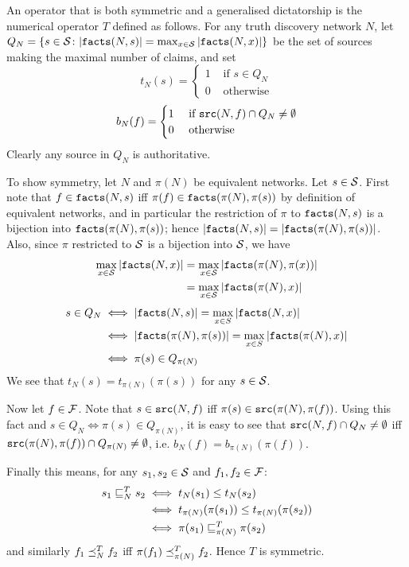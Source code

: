 \documentclass[../main.tex]{subfiles}
\begin{document}
\begin{example}
\label{example:symm_and_gen_dict}
An operator that is both symmetric and a generalised dictatorship is the
numerical operator $T$ defined as follows. For any truth discovery network $N$,
let $Q_N = \{s \in \S \colon |\fact(N, s)| = \max_{x \in \S}{|\fact(N, x)|}\}$
be the set of sources making the maximal number of claims, and set
\[
    t_N(s) = \begin{cases}
        1 & \text{ if } s \in Q_N \\
        0 & \text{ otherwise}
    \end{cases}
\]
\[
    b_N(f) = \begin{cases}
        1 & \text{ if } \src(N, f) \cap Q_N \ne \emptyset \\
        0 & \text{ otherwise}
    \end{cases}
\]
Clearly any source in $Q_N$ is authoritative.

To show symmetry, let $N$ and $\pi(N)$ be equivalent networks. Let $s \in \S$.
First note that $f \in \fact(N, s)$ iff $\pi(f) \in \fact(\pi(N), \pi(s))$ by
definition of equivalent networks, and in particular the restriction of $\pi$
to $\fact(N, s)$ is a bijection into $\fact(\pi(N), \pi(s))$; hence $|\fact(N,
s)| = |\fact(\pi(N), \pi(s))|$. Also, since $\pi$ restricted to $\S$ is a
bijection into $\S$, we have
\begin{align*}
    \max_{x \in \S}{|\fact(N, x)|} & = \max_{x \in \S}{|\fact(\pi(N), \pi(x))|} \\
                                   & = \max_{x \in \S}{|\fact(\pi(N), x)|}
\end{align*}
\begin{align*}
    s \in Q_N & \iff |\fact(N, s)| = \max_{x \in S}{|\fact(N, x)|} \\
              & \iff |\fact(\pi(N), \pi(s))| = \max_{x \in S}{|\fact(\pi(N), x)|} \\
              & \iff \pi(s) \in Q_{\pi(N)}
\end{align*}
We see that $t_N(s) = t_{\pi(N)}(\pi(s))$ for any $s \in \S$.

Now let $f \in \F$. Note that $s \in \src(N, f)$ iff $\pi(s) \in \src(\pi(N),
\pi(f))$. Using this fact and $s \in Q_N \iff \pi(s) \in Q_{\pi(N)}$, it is
easy to see that $\src(N, f) \cap Q_N \ne \emptyset$ iff $\src(\pi(N), \pi(f))
\cap Q_{\pi(N)} \ne \emptyset$, i.e. $b_N(f) = b_{\pi(N)}(\pi(f))$.

Finally this means, for any $s_1, s_2 \in \S$ and $f_1, f_2 \in \F$:
\begin{align*}
    s_1 \sle_N^T s_2 & \iff t_N(s_1) \le t_N(s_2) \\
                     & \iff t_{\pi(N)}(\pi(s_1)) \le t_{\pi(N)}(\pi(s_2)) \\
                     & \iff \pi(s_1) \sle_{\pi(N)}^T \pi(s_2)
\end{align*}
and similarly $f_1 \fle_N^T f_2$ iff $\pi(f_1) \fle_{\pi(N)}^T f_2$. Hence $T$
is symmetric.
\end{example}
\end{document}

